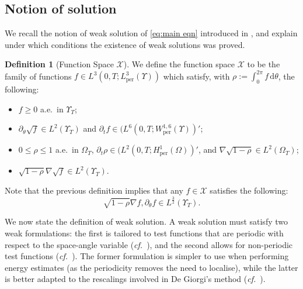 \documentclass[11pt,a4paper,reqno]{amsart}
\theoremstyle{remark}
\theoremstyle{definition}
\newtheorem{definition}[prop]{Definition}
\numberwithin{equation}{section}
\newcommand{\per}{\mathrm{per}}
\renewcommand{\d}{\, \mathrm{d} }
\begin{document}
\subsection{Notion of solution}

We recall the notion of weak solution of \eqref{eq:main eqn} introduced in \cite{Martin}, and explain under which conditions the existence of weak solutions was proved. 


\begin{definition}[Function Space $\mathcal{X}$]\label{def:function space}
   We define the function space $\mathcal{X}$ to be the family of functions $f \in L^3(0,T;L^3_\per(\Upsilon))$ which satisfy, with $\rho := \int_0^{2\pi} f \d \theta$, the following: 
    \begin{itemize}
        \item[(i)] $f \geq 0$ a.e.~in $\Upsilon_T$; 
        \item[(ii)] $\partial_\theta \sqrt{f} \in L^2(\Upsilon_T)$ and $\partial_t f \in (L^6(0,T;W^{1,6}_\per(\Upsilon))'$; 
        \item[(iii)] $0 \leq \rho \leq 1$ a.e.~in $\Omega_T$, $\partial_t \rho \in (L^2(0,T;H^1_\per(\Omega))'$, and $\nabla\sqrt{1-\rho} \in L^2(\Omega_T)$; 
        \item[(iv)] $\sqrt{1-\rho}\nabla\sqrt{f} \in L^2(\Upsilon_T)$. 
    \end{itemize}
\end{definition}
Note that the previous definition implies that any $f \in \mathcal{X}$ satisfies the following: 
\begin{equation}\label{eq:early boundedness nabla f weighted in intro}
    \sqrt{1-\rho}\nabla f , \partial_\theta f \in L^{\frac{3}{2}}(\Upsilon_T). 
\end{equation}

We now state the definition of weak solution. A weak solution must satisfy two weak formulations: the first is tailored to test functions that are periodic %
with respect to the space-angle variable (\textit{cf.}~\cite[Definition 1.1]{Martin}), and the second allows for non-periodic test functions (\textit{cf.}~\cite[Lemma 4.2]{Martin}). The former formulation is simpler to use when performing energy estimates (as the periodicity removes the need to localise), while the latter is better adapted to the rescalings involved in De Giorgi's method (\textit{cf.}~\cite[\S 2]{reg1}). 
\end{document}
